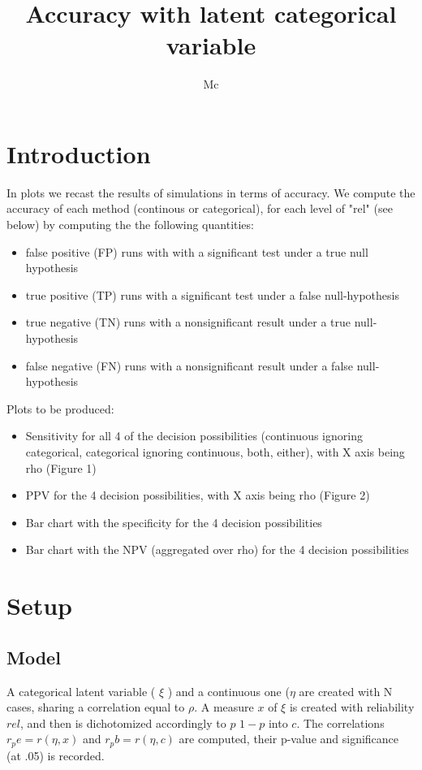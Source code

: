 \documentclass{article}
\begin{document}


\title{Accuracy with latent categorical variable}

\author{Mc}
\maketitle
\section*{Introduction}
In plots we recast the results of simulations in terms of accuracy. We compute the accuracy of each method (continous or categorical), for each level of "rel" (see below) by computing the  the following quantities:
\begin{itemize}
  \item false positive (FP)  runs with  with a significant test under a true null hypothesis
  \item true positive (TP) runs with a significant test under a false null-hypothesis 
  \item true negative (TN) runs  with a nonsignificant result under a true null-hypothesis
  \item false negative (FN) runs with a nonsignificant result under a false null-hypothesis

\end{itemize}

Plots to be produced:
\begin{itemize}
  \item Sensitivity for all 4 of the decision possibilities (continuous ignoring categorical, categorical ignoring continuous, both, either), with X axis being rho (Figure 1)
  \item PPV for the 4 decision possibilities, with X axis being rho (Figure 2)
  \item Bar chart with the specificity for the 4 decision possibilities
  \item Bar chart with the NPV (aggregated over rho) for the 4 decision possibilities
\end{itemize}

\section*{Setup}
\subsection*{Model}
A categorical latent variable ( \(\xi\) ) and a continuous one (\(\eta\) are created with N cases, sharing a correlation equal to \(\rho\). A measure \(x\) of \(\xi\) is created with reliability \(rel\), and then  is dichotomized accordingly to \(p\) \(1-p\) into \(c\). The correlations \( r_pe=r(\eta,x) \)  and \( r_pb=r(\eta,c) \) are computed, their p-value and significance (at .05) is recorded.
\end{document}
